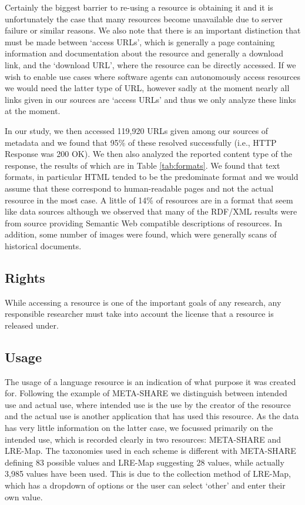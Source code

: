 \documentclass[smallextended]{svjour3}       %
\begin{document}
Certainly the biggest barrier to re-using a resource is obtaining it and it is
unfortunately the case that many resources become unavailable due to server
failure or similar reasons. We also note that there is an important distinction
that must be made between `access URLs', which is generally a page containing
information and documentation about the resource and generally a download link,
and the `download URL', where the resource can be directly accessed. If we wish
to enable use cases where software agents can autonomously access resources we
would need the latter type of URL, however sadly at the moment nearly all links
given in our sources are `access URLs' and thus we only analyze these links at
the moment.

In our study, we then accessed 119,920 URLs given among our sources of metadata
and we found that 95\% of these resolved successfully (i.e., HTTP Response was
200 OK). We then also analyzed the reported content type of the response, the
results of which are in Table \ref{tab:formats}. We found that text formats, in
particular HTML tended to be the predominate format and we would assume that
these correspond to human-readable pages and not the actual resource in the most
case. A little of 14\% of resources are in a format that seem like data sources
although we observed that many of the RDF/XML results were from source providing
Semantic Web compatible descriptions of resources. In addition, some number of
images were found, which were generally scans of historical documents.

\subsection{Rights}

While accessing a resource is one of the important goals of any research, any
responsible researcher must take into account the license that a resource is
released under. 


\subsection{Usage}

The usage of a language resource is an indication of what purpose it was
created for. Following the example of META-SHARE we distinguish between intended use
and actual use, where intended use is the use by the creator of the resource and
the actual use is another application that has used this resource. As the data
has very little information on the latter case, we focussed primarily on the
intended use, which is recorded clearly in two resources: META-SHARE and
LRE-Map. The taxonomies used in each scheme is different with META-SHARE
defining 83 possible values and LRE-Map suggesting 28 values, while actually
3,985 values have been used. This is due to the collection method of LRE-Map,
which has a dropdown of options or the user can select `other' and enter their
own value. 
\end{document}
